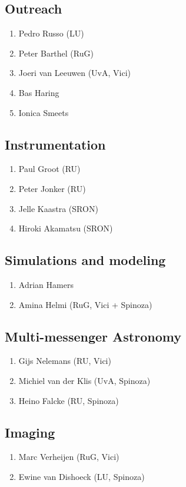 \documentclass{article}
\begin{document}
\subsection{Outreach}
\begin{enumerate}
    \item Pedro Russo (LU)
    \item Peter Barthel (RuG)
    \item Joeri van Leeuwen (UvA, Vici)
    \item Bas Haring
    \item Ionica Smeets
\end{enumerate}

\subsection{Instrumentation}
\begin{enumerate}
    \item Paul Groot (RU)
    \item Peter Jonker (RU)
    \item Jelle Kaastra (SRON)
    \item Hiroki Akamatsu (SRON)
\end{enumerate}

\subsection{Simulations and modeling}
\begin{enumerate}
    \item Adrian Hamers
    \item Amina Helmi (RuG, Vici + Spinoza)
\end{enumerate}

\subsection{Multi-messenger Astronomy}
\begin{enumerate}
    \item Gijs Nelemans (RU, Vici)
    \item Michiel van der Klis (UvA, Spinoza)
    \item Heino Falcke (RU, Spinoza)
\end{enumerate}

\subsection{Imaging}
\begin{enumerate}
    \item Marc Verheijen (RuG, Vici)
    \item Ewine van Dishoeck (LU, Spinoza)
\end{enumerate}
\end{document}
